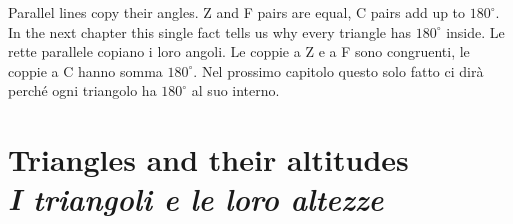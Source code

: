 \documentclass[10pt,a4paper,oneside]{book}
\newcommand{\bichapter}[2]{%
  \chapter[#1 \textperiodcentered\ #2]{#1\\[2pt]{\color{itgreen}\itshape #2}}}
\begin{document}
\begin{keyidea}{}{}
Parallel lines copy their angles. Z and F pairs are equal, C pairs add up to $180^\circ$. In the next chapter this single fact tells us why every triangle has $180^\circ$ inside.
\tcblower
Le rette parallele copiano i loro angoli. Le coppie a Z e a F sono congruenti, le coppie a C hanno somma $180^\circ$. Nel prossimo capitolo questo solo fatto ci dirà perché ogni triangolo ha $180^\circ$ al suo interno.
\end{keyidea}


\bichapter{Triangles and their altitudes}{I triangoli e le loro altezze}\label{ch:triangles}
\end{document}

